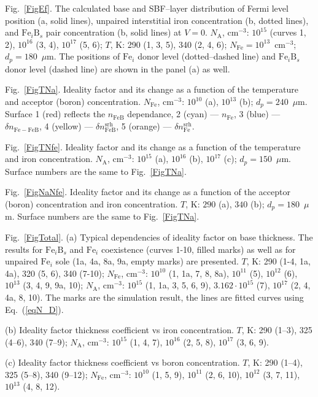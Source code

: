 \documentclass[12pt]{article}
\begin{document}
 Fig.~\ref{FigEf}.
The calculated base and SBF--layer distribution of Fermi level position (a, solid lines), unpaired interstitial iron concentration (b, dotted lines),
and $\mathrm{Fe}_i\mathrm{B}_s$ pair concentration (b, solid lines) at $V=0$.
$N_\mathrm{A}$, cm$^{-3}$: $10^{15}$ (curves 1, 2), $10^{16}$ (3, 4), $10^{17}$ (5, 6);
$T$, K: 290 (1, 3, 5), 340 (2, 4, 6);
$N_\mathrm{Fe}=10^{13}$~cm$^{-3}$;
$d_p=180$~$\mu$m.
The positions of $\mathrm{Fe}_i$ donor level (dotted--dashed line) and $\mathrm{Fe}_i\mathrm{B}_s$
 donor level (dashed line) are shown in the panel (a) as well.

 Fig.~\ref{FigTNa}.
Ideality factor and its change as a function of the temperature and acceptor (boron) concentration.
$N_\mathrm{Fe}$, cm$^{-3}$: $10^{10}$ (a), $10^{13}$ (b);
$d_p=240$~$\mu$m.
Surface 1 (red) reflects the  $n_\mathrm{FeB}$ dependance,
2 (cyan) ---  $n_\mathrm{Fe}$,
3 (blue) --- $\delta n_\mathrm{Fe-FeB}$,
4 (yellow) --- $\delta n_\mathrm{FeB}^\mathrm{srh}$,
5 (orange) --- $\delta n_\mathrm{Fe}^\mathrm{srh}$.


 Fig.~\ref{FigTNfe}.
Ideality factor and its change as a function of the temperature and iron concentration.
$N_\mathrm{A}$, cm$^{-3}$: $10^{15}$ (a), $10^{16}$ (b), $10^{17}$ (c);
$d_p=150$~$\mu$m.
Surface numbers are the same to Fig.~\ref{FigTNa}.

 Fig.~\ref{FigNaNfe}.
Ideality factor and its change as a function of the acceptor (boron) concentration and iron concentration.
$T$, K: $290$ (a), $340$ (b);
$d_p=180$~$\mu$m.
Surface numbers are the same to Fig.~\ref{FigTNa}.


 Fig.~\ref{FigTotal}.
(a) Typical dependencies of ideality factor on base thickness.
The results for $\mathrm{Fe}_i\mathrm{B}_s$ and $\mathrm{Fe}_i$ coexistence (curves 1-10, filled marks)
as well as for unpaired $\mathrm{Fe}_i$ sole (1a, 4a, 8a, 9a, empty marks) are presented.
$T$, K: 290 (1-4, 1a, 4a), 320 (5, 6), 340 (7-10);
$N_\mathrm{Fe}$, cm$^{-3}$: $10^{10}$ (1, 1a, 7, 8, 8a), $10^{11}$ (5), $10^{12}$ (6), $10^{13}$ (3, 4, 9, 9a, 10);
$N_\mathrm{A}$, cm$^{-3}$: $10^{15}$ (1, 1a, 3, 5, 6, 9), $3.162\cdot10^{15}$ (7),  $10^{17}$ (2, 4, 4a, 8, 10).
The marks are the simulation result,
the lines are fitted curves using Eq.~(\ref{eqN_D}).

(b) Ideality factor thickness coefficient vs iron concentration.
$T$, K: 290 (1--3), 325 (4--6), 340 (7--9);
$N_\mathrm{A}$, cm$^{-3}$: $10^{15}$ (1, 4, 7), $10^{16}$ (2, 5, 8),  $10^{17}$ (3, 6, 9).

(c) Ideality factor thickness coefficient vs boron concentration.
$T$, K: 290 (1--4), 325 (5--8), 340 (9--12);
$N_\mathrm{Fe}$, cm$^{-3}$: $10^{10}$ (1, 5, 9), $10^{11}$ (2, 6, 10),  $10^{12}$ (3, 7, 11), $10^{13}$ (4, 8, 12).
\end{document}
